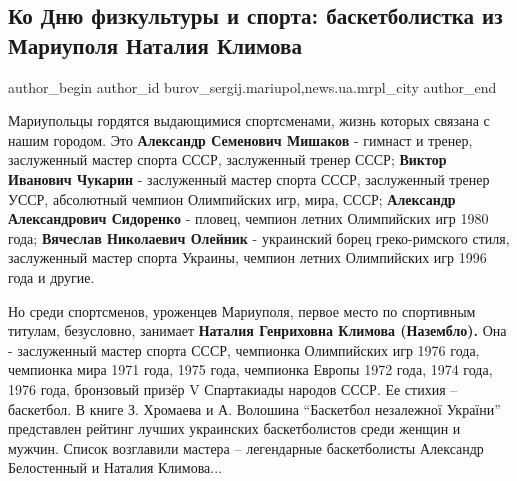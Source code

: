  
 
 
 
 
 
\subsection{Ко Дню физкультуры и спорта: баскетболистка из Мариуполя Наталия Климова}
\label{sec:14_09_2019.stz.news.ua.mrpl_city.1.basketbolistka_natalia_klimova}
 
\ifcmt
 author_begin
   author_id burov_sergij.mariupol,news.ua.mrpl_city
 author_end
\fi


Мариупольцы гордятся выдающимися спортсменами, жизнь которых связана с нашим
городом. Это \textbf{Александр Семенович Мишаков} - гимнаст и тренер, заслуженный мастер
спорта СССР, заслуженный тренер СССР; \textbf{Виктор Иванович Чукарин} - заслуженный
мастер спорта СССР, заслуженный тренер УССР, абсолютный чемпион Олимпийских
игр, мира, СССР; \textbf{Александр Александрович Сидоренко} - пловец, чемпион летних
Олимпийских игр 1980 года; \textbf{Вячеслав Николаевич Олейник} - украинский борец
греко-римского стиля, заслуженный мастер спорта Украины, чемпион летних
Олимпийских игр 1996 года и другие.

Но среди спортсменов, уроженцев Мариуполя, первое место по спортивным титулам,
безусловно, занимает \textbf{Наталия Генриховна Климова (Назембло).} Она - заслуженный
мастер спорта СССР, чемпионка Олимпийских игр 1976 года, чемпионка мира 1971
года, 1975 года, чемпионка Европы 1972 года, 1974 года, 1976 года, бронзовый
призёр V Спартакиады народов СССР. Ее стихия – баскетбол. В книге З. Хромаева и
А. Волошина \enquote{Баскетбол незалежної України} представлен рейтинг лучших
украинских баскетболистов среди женщин и мужчин. Список возглавили мастера –
легендарные баскетболисты Александр Белостенный и Наталия Климова...

